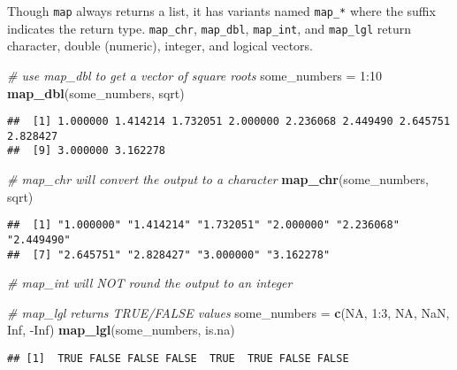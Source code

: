 \documentclass[
]{book}
\newenvironment{Shaded}{}{}
\newcommand{\CommentTok}[1]{\textcolor[rgb]{0.38,0.63,0.69}{\textit{#1}}}
\newcommand{\DecValTok}[1]{\textcolor[rgb]{0.25,0.63,0.44}{#1}}
\newcommand{\KeywordTok}[1]{\textcolor[rgb]{0.00,0.44,0.13}{\textbf{#1}}}
\newcommand{\NormalTok}[1]{#1}
\newcommand{\OperatorTok}[1]{\textcolor[rgb]{0.40,0.40,0.40}{#1}}
\newcommand{\OtherTok}[1]{\textcolor[rgb]{0.00,0.44,0.13}{#1}}
\newcommand{\StringTok}[1]{\textcolor[rgb]{0.25,0.44,0.63}{#1}}
\begin{document}
Though \texttt{map} always returns a list, it has variants named \texttt{map\_*} where the suffix indicates the return type.
\texttt{map\_chr}, \texttt{map\_dbl}, \texttt{map\_int}, and \texttt{map\_lgl} return character, double (numeric), integer, and logical vectors.

\begin{Shaded}
\begin{Highlighting}[]
\CommentTok{# use map_dbl to get a vector of square roots}
\NormalTok{some_numbers =}\StringTok{ }\DecValTok{1}\OperatorTok{:}\DecValTok{10}
\KeywordTok{map_dbl}\NormalTok{(some_numbers, sqrt)}
\end{Highlighting}
\end{Shaded}

\begin{verbatim}
##  [1] 1.000000 1.414214 1.732051 2.000000 2.236068 2.449490 2.645751 2.828427
##  [9] 3.000000 3.162278
\end{verbatim}

\begin{Shaded}
\begin{Highlighting}[]
\CommentTok{# map_chr will convert the output to a character}
\KeywordTok{map_chr}\NormalTok{(some_numbers, sqrt)}
\end{Highlighting}
\end{Shaded}

\begin{verbatim}
##  [1] "1.000000" "1.414214" "1.732051" "2.000000" "2.236068" "2.449490"
##  [7] "2.645751" "2.828427" "3.000000" "3.162278"
\end{verbatim}

\begin{Shaded}
\begin{Highlighting}[]
\CommentTok{# map_int will NOT round the output to an integer}

\CommentTok{# map_lgl returns TRUE/FALSE values}
\NormalTok{some_numbers =}\StringTok{ }\KeywordTok{c}\NormalTok{(}\OtherTok{NA}\NormalTok{, }\DecValTok{1}\OperatorTok{:}\DecValTok{3}\NormalTok{, }\OtherTok{NA}\NormalTok{, }\OtherTok{NaN}\NormalTok{, }\OtherTok{Inf}\NormalTok{, }\OperatorTok{-}\OtherTok{Inf}\NormalTok{)}
\KeywordTok{map_lgl}\NormalTok{(some_numbers, is.na)}
\end{Highlighting}
\end{Shaded}

\begin{verbatim}
## [1]  TRUE FALSE FALSE FALSE  TRUE  TRUE FALSE FALSE
\end{verbatim}
\end{document}
